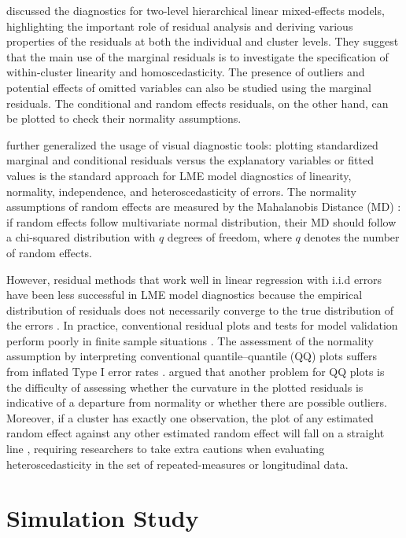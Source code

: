 \documentclass[12pt]{article}
\begin{document}
\citet{Snijders2008-dm} discussed the diagnostics for two-level
hierarchical linear mixed-effects models, highlighting the important
role of residual analysis and deriving various properties of the
residuals at both the individual and cluster levels. They suggest that
the main use of the marginal residuals is to investigate the
specification of within-cluster linearity and homoscedasticity. The
presence of outliers and potential effects of omitted variables can also
be studied using the marginal residuals. The conditional and random
effects residuals, on the other hand, can be plotted to check their
normality assumptions.

\citet{Singer2017-sd} further generalized the usage of visual diagnostic
tools: plotting standardized marginal and conditional residuals versus
the explanatory variables or fitted values is the standard approach for
LME model diagnostics of linearity, normality, independence, and
heteroscedasticity of errors. The normality assumptions of random
effects are measured by the Mahalanobis Distance (MD)
\citep{mahalanobis1936generalized, mclachlan1999mahalanobis}: if random
effects follow multivariate normal distribution, their MD should follow
a chi-squared distribution with \(q\) degrees of freedom, where \(q\)
denotes the number of random effects.

However, residual methods that work well in linear regression with i.i.d
errors have been less successful in LME model diagnostics because the
empirical distribution of residuals does not necessarily converge to the
true distribution of the errors \citep{jiang1998asymptotic}. In
practice, conventional residual plots and tests for model validation
perform poorly in finite sample situations \citep{Loy2017-fo}. The
assessment of the normality assumption by interpreting conventional
quantile--quantile (QQ) plots suffers from inflated Type I error rates
\citep{Loy2015-vl}. \citet{Schutzenmeister2012} argued that another
problem for QQ plots is the difficulty of assessing whether the
curvature in the plotted residuals is indicative of a departure from
normality or whether there are possible outliers. Moreover, if a cluster
has exactly one observation, the plot of any estimated random effect
against any other estimated random effect will fall on a straight line
\citep{Morrell2000-ut}, requiring researchers to take extra cautions
when evaluating heteroscedasticity in the set of repeated-measures or
longitudinal data.

\section{Simulation Study}
\end{document}
